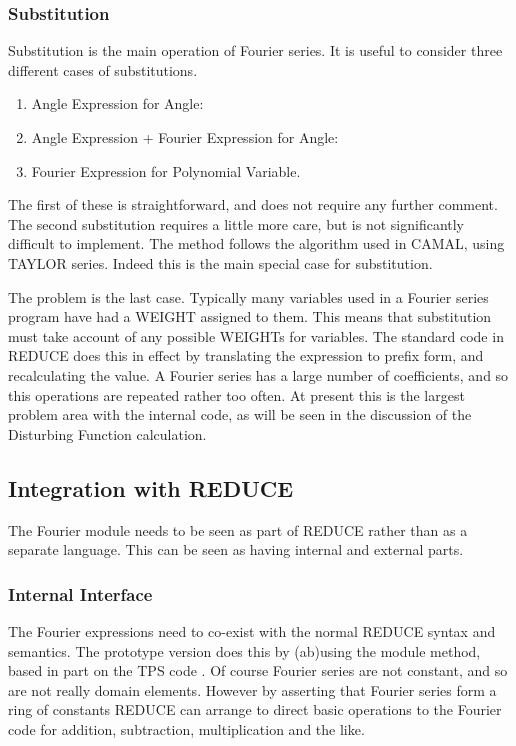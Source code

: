 \subsubsection{Substitution}

Substitution is the main operation of Fourier series.  It is useful to
consider three different cases of substitutions.
\begin{enumerate}
\item Angle Expression for Angle:
\item Angle Expression + Fourier Expression for Angle:
\item Fourier Expression for Polynomial Variable.
\end{enumerate}

The first of these is straightforward, and does not require any
further comment.  The second substitution requires a little more care,
but is not significantly difficult to implement.  The method follows
the algorithm used in CAMAL, using TAYLOR series.  Indeed this is the
main special case for substitution.

The problem is the last case.  Typically many variables used in a
Fourier series program have had a WEIGHT assigned to them.  This means
that substitution must take account of any possible WEIGHTs for
variables.  The standard code in REDUCE does this in effect by
translating the expression to prefix form, and recalculating the value.
A Fourier series has a large number of coefficients, and so this
operations are repeated rather too often.  At present this is the
largest problem area with the internal code, as will be seen in the
discussion of the Disturbing Function calculation.

\subsection{Integration with REDUCE}

The Fourier module needs to be seen as part of REDUCE rather than as a
separate language.  This can be seen as having internal and external
parts.

\subsubsection{Internal Interface}

The Fourier expressions need to co-exist with the normal REDUCE syntax
and semantics.  The prototype version does this by (ab)using the
module method, based in part on the TPS code \cite{Padget90}.  Of course
Fourier series are not constant, and so are not really domain
elements.  However by asserting that Fourier series form a ring of
constants REDUCE can arrange to direct basic operations to the Fourier
code for addition, subtraction, multiplication and the like.

